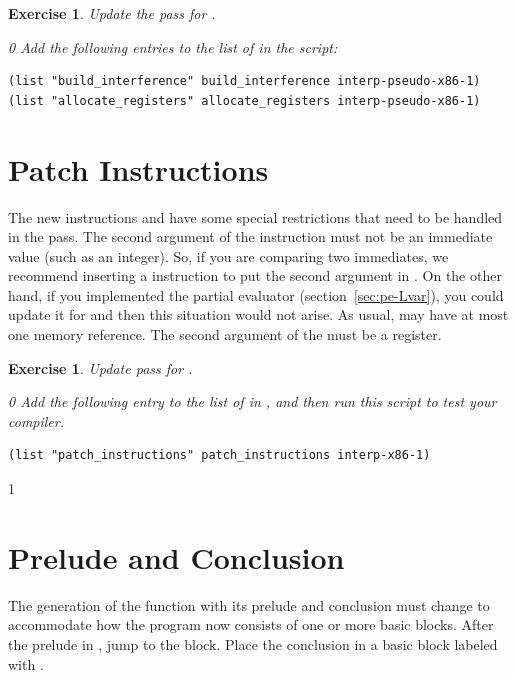 \documentclass[7x10]{TimesAPriori_MIT}%
\def\racketEd{0}
\def\pythonEd{1}
\def\edition{1}
\newcommand{\pythonColor}[0]{}
\newtheorem{exercise}[theorem]{Exercise}
\numberwithin{theorem}{chapter}
\numberwithin{definition}{chapter}
\numberwithin{equation}{chapter}
\begin{document}
\begin{exercise}\normalfont\normalsize
Update the  pass for \LangXIfVar{}.
{\if\edition\racketEd
Add the following entries to the list of  in the
 script:
\begin{lstlisting}
(list "build_interference" build_interference interp-pseudo-x86-1)
(list "allocate_registers" allocate_registers interp-pseudo-x86-1)
\end{lstlisting}
\fi}
\end{exercise}


\section{Patch Instructions}

The new instructions  and  have some special
restrictions that need to be handled in the 
pass.
%
The second argument of the  instruction must not be an
immediate value (such as an integer). So, if you are comparing two
immediates, we recommend inserting a  instruction to put the
second argument in . On the other hand, if you implemented
the partial evaluator (section~\ref{sec:pe-Lvar}), you could
update it for \LangIf{} and then this situation would not arise.
%
As usual,  may have at most one memory reference.
%
The second argument of the  must be a register.

\begin{exercise}\normalfont\normalsize
%
Update  pass for \LangXIfVar{}.
%  
{\if\edition\racketEd
Add the following entry to the list of  in
, and then run this script to test your compiler.
\begin{lstlisting}
(list "patch_instructions" patch_instructions interp-x86-1)
\end{lstlisting}
\fi}
\end{exercise}


{\if\edition\pythonEd\pythonColor
  
\section{Prelude and Conclusion}
\label{sec:prelude-conclusion-cond}

The generation of the  function with its prelude and
conclusion must change to accommodate how the program now consists of
one or more basic blocks. After the prelude in , jump to
the  block. Place the conclusion in a basic block labeled
with .

\fi}
\end{document}

